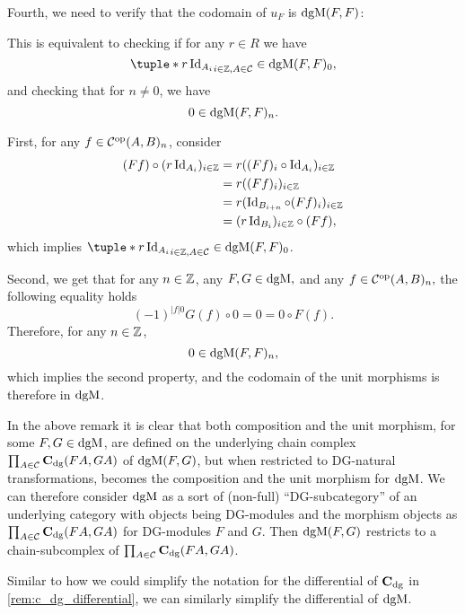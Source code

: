 \begin{remark}
    Fourth, we need to verify that the codomain of \( u_F \) is \( \operatorname{dgM}(F, F) \):
    
    This is equivalent to checking if for any \( r \in R \) we have
    \[
        \tuple*{ r \Id_{A_i} }_{i \in \Zb, A \in \Cc} \in \dgM(F, F)_0,
    \]
    and checking that for \( n \neq 0 \), we have
    \[
        0 \in \operatorname{dgM}(F, F)_n.
    \]

    First, for any \( f \in {\mathcal{C}}^{\operatorname{op}}(A, B)_n \), consider
    \begin{align*}
        (F f) \circ (r \operatorname{Id}_{A_i})_{i \in {\mathbb{Z}}} &= r ((F f)_i \circ \operatorname{Id}_{A_i})_{i \in {\mathbb{Z}}} \\
        &= r ((F f)_i)_{i \in {\mathbb{Z}}} \\
        &= r (\operatorname{Id}_{B_{i + n}} \circ (F f)_i)_{i \in {\mathbb{Z}}} \\
        &= (r \operatorname{Id}_{B_i})_{i \in {\mathbb{Z}}} \circ (F f),
    \end{align*}
    which implies \( \tuple*{ r \Id_{A_i} }_{i \in \Zb, A \in \Cc} \in \dgM(F, F)_0 \).

    Second, we get that for any \( n \in {\mathbb{Z}} \), any \( F, G \in \operatorname{dgM}, \) and any \( f \in {\mathcal{C}}^{\operatorname{op}}(A, B)_n, \) the following equality holds
    \[
        (-1)^{|f|0}G(f) \circ 0 = 0 = 0 \circ F(f).
    \]
    Therefore, for any \( n \in {\mathbb{Z}} \),
    \[
        0 \in \operatorname{dgM}(F, F)_n,
    \]
    which implies the second property, and the codomain of the unit morphisms is therefore in \( \operatorname{dgM} \).
\end{remark}

In the above remark it is clear that both composition and the unit morphism, for some \( F, G \in \operatorname{dgM} \), are defined on the underlying chain complex \( \prod_{A \in {\mathcal{C}}} \operatorname{\mathbf{C}}_{\operatorname{dg}}(F A, G A) \) of \( \operatorname{dgM}(F, G) \), but when restricted to DG-natural transformations, becomes the composition and the unit morphism for \( \operatorname{dgM} \). We can therefore consider \( \operatorname{dgM} \) as a sort of (non-full) ``DG-subcategory'' of an underlying category with objects being DG-modules and the morphism objects as \( \prod_{A \in {\mathcal{C}}} \operatorname{\mathbf{C}}_{\operatorname{dg}}(F A, G A) \) for DG-modules \( F \) and \( G \). Then \( \operatorname{dgM}(F, G) \) restricts to a chain-subcomplex of \( \prod_{A \in {\mathcal{C}}} \operatorname{\mathbf{C}}_{\operatorname{dg}}(F A, G A) \).

Similar to how we could simplify the notation for the differential of \( \operatorname{\mathbf{C}}_{\operatorname{dg}} \) in \autoref{rem:c_dg_differential}, we can similarly simplify the differential of \( \operatorname{dgM} \).

